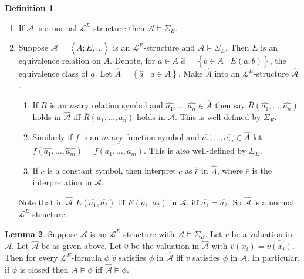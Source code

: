 \documentclass{article}
\newcommand{\rb}[1]{\left( #1 \right)}
\newcommand{\cb}[1]{\left\{ #1 \right\}}
\newcommand{\ab}[1]{\left\langle #1 \right\rangle}
\theoremstyle{definition}\newtheorem{definition}{Definition}[subsection]
\theoremstyle{definition}\newtheorem{remark}[definition]{Remark}
\theoremstyle{definition}\newtheorem*{example}{Example}
\theoremstyle{definition}\newtheorem*{note}{Note}
\newtheorem{lemma}[definition]{Lemma}
\begin{document}
\begin{definition}
\hfill
\begin{enumerate}
\item If $ \mathcal{A} $ is a normal $ \mathcal{L}^E $-structure then $ \mathcal{A} \vDash \Sigma_E $.
\item Suppose $ \mathcal{A} = \ab{A; \bar{E}, \dots} $ is an $ \mathcal{L}^E $-structure and $ \mathcal{A} \vDash \Sigma_E $. Then $ \bar{E} $ is an equivalence relation on $ A $. Denote, for $ a \in A $ $ \widehat{a} = \cb{b \in A \mid \bar{E}\rb{a, b}} $, the equivalence class of $ a $. Let $ \widehat{A} = \cb{\widehat{a} \mid a \in A} $. Make $ \widehat{A} $ into an $ \mathcal{L}^E $-structure $ \widehat{\mathcal{A}} $.
\begin{enumerate}
\item If $ R $ is an $ n $-ary relation symbol and $ \widehat{a_1}, \dots, \widehat{a_n} \in \widehat{A} $ then say $ \bar{R}\rb{\widehat{a_1}, \dots, \widehat{a_n}} $ holds in $ \widehat{\mathcal{A}} $ iff $ \bar{R}\rb{a_1, \dots, a_n} $ holds in $ \mathcal{A} $. This is well-defined by $ \Sigma_E $.
\item Similarly if $ f $ is an $ m $-ary function symbol and $ \widehat{a_1}, \dots, \widehat{a_m} \in \widehat{A} $ let $ \bar{f}\rb{\widehat{a_1}, \dots, \widehat{a_m}} = \widehat{\bar{f}\rb{a_1, \dots, a_m}} $. This is also well-defined by $ \Sigma_E $.
\item If $ c $ is a constant symbol, then interpret $ c $ as $ \widehat{\bar{c}} $ in $ \widehat{A} $, where $ \bar{c} $ is the interpretation in $ \mathcal{A} $.
\end{enumerate}
Note that in $ \widehat{\mathcal{A}} $ $ \bar{E}\rb{\widehat{a_1}, \widehat{a_2}} $ iff $ \bar{E}\rb{a_1, a_2} $ in $ \mathcal{A} $, iff $ \widehat{a_1} = \widehat{a_2} $. So $ \widehat{\mathcal{A}} $ is a normal $ \mathcal{L}^E $-structure.
\end{enumerate}
\end{definition}

\begin{lemma}
\label{lem:2.6.3}
Suppose $ \mathcal{A} $ is an $ \mathcal{L}^E $-structure with $ \mathcal{A} \vDash \Sigma_E $. Let $ v $ be a valuation in $ \mathcal{A} $. Let $ \widehat{\mathcal{A}} $ be as given above. Let $ \widehat{v} $ be the valuation in $ \widehat{\mathcal{A}} $ with $ \widehat{v}\rb{x_i} = \widehat{v\rb{x_i}} $. Then for every $ \mathcal{L}^E $-formula $ \phi $ $ \widehat{v} $ satisfies $ \phi $ in $ \widehat{\mathcal{A}} $ iff $ v $ satisfies $ \phi $ in $ \mathcal{A} $. In particular, if $ \phi $ is closed then $ \mathcal{A} \vDash \phi $ iff $ \widehat{\mathcal{A}} \vDash \phi $.
\end{lemma}
\end{document}
